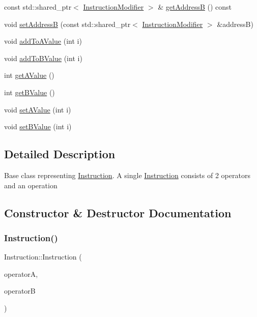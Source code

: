 \begin{DoxyCompactItemize}
const std\+::shared\+\_\+ptr$<$ \hyperlink{classInstructionModifier}{Instruction\+Modifier} $>$ \& \hyperlink{classInstruction_a587656e972cb049fe5cd22159451d508}{get\+AddressB} () const
\item 
void \hyperlink{classInstruction_a8537c5d0dd3696b5f48ae297f4e89dbf}{set\+AddressB} (const std\+::shared\+\_\+ptr$<$ \hyperlink{classInstructionModifier}{Instruction\+Modifier} $>$ \&addressB)
\item 
void \hyperlink{classInstruction_a69c97b99c08ae8997122fb99e139c9aa}{add\+To\+A\+Value} (int i)
\item 
void \hyperlink{classInstruction_af626c46ca16688de0a7b31a88817fd39}{add\+To\+B\+Value} (int i)
\item 
int \hyperlink{classInstruction_a86228a629fcccffffeb73b9b17201864}{get\+A\+Value} ()
\item 
int \hyperlink{classInstruction_a02e899031bb2cb33d6e09bcfce3f9569}{get\+B\+Value} ()
\item 
void \hyperlink{classInstruction_a3650c10f4821a87e865906c5095d9e98}{set\+A\+Value} (int i)
\item 
void \hyperlink{classInstruction_aff4dda9270970f00f48d70245a79122c}{set\+B\+Value} (int i)
\end{DoxyCompactItemize}


\subsection{Detailed Description}
Base class representing \hyperlink{classInstruction}{Instruction}. A single \hyperlink{classInstruction}{Instruction} consists of 2 operators and an operation 

\subsection{Constructor \& Destructor Documentation}
\mbox{\label{classInstruction_a8189c6e3e0caeaec698ae8053abf84b4}} 
\subsubsection{\texorpdfstring{Instruction()}{Instruction()}\hspace{0.1cm}{\footnotesize\ttfamily [1/3]}}
{\footnotesize\ttfamily Instruction\+::\+Instruction (\begin{DoxyParamCaption}\item[{const std\+::shared\+\_\+ptr$<$ \hyperlink{classInstructionModifier}{Instruction\+Modifier} $>$}]{operatorA,  }\item[{const std\+::shared\+\_\+ptr$<$ \hyperlink{classInstructionModifier}{Instruction\+Modifier} $>$}]{operatorB }\end{DoxyParamCaption})}

